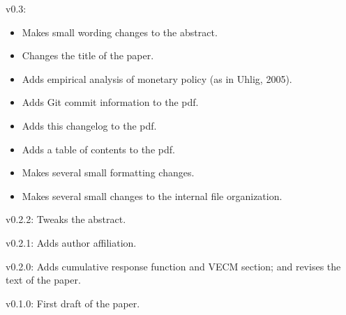 \begin{description}
\item{v0.3:}
  \begin{itemize}[noitemsep]
  \item Makes small wording changes to the abstract.
  \item Changes the title of the paper.
  \item Adds empirical analysis of monetary policy (as in Uhlig, 2005).
  \item Adds Git commit information to the pdf.
  \item Adds this changelog to the pdf.
  \item Adds a table of contents to the pdf.
  \item Makes several small formatting changes.
  \item Makes several small changes to the internal file organization.
  \end{itemize}

\item{v0.2.2:} Tweaks the abstract.

\item{v0.2.1:} Adds author affiliation.

\item{v0.2.0:} Adds cumulative response function and VECM section; and
  revises the text of the paper.

\item{v0.1.0:} First draft of the paper.
\end{description}

